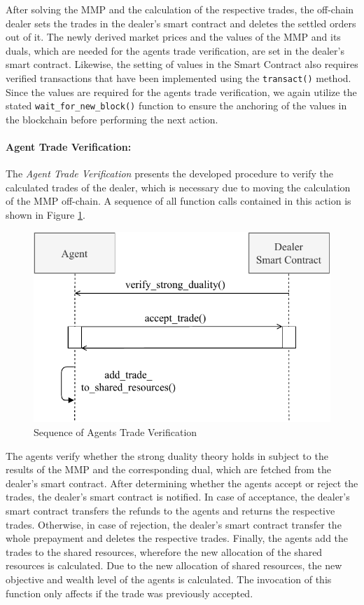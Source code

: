 After solving the MMP and the calculation of the respective 
trades, the off-chain dealer sets the trades in the dealer's smart contract
and deletes the settled orders out of it.
The newly derived market prices and the values of the MMP and its duals, which are needed 
for the agents trade verification, are set in the dealer's smart contract.
Likewise, the setting of values in the Smart Contract also requires verified 
transactions that have been implemented using the \verb|transact()| method. Since the 
values are required for the agents trade verification, we again utilize the stated 
\verb|wait_for_new_block()| function to ensure the anchoring of the values in the blockchain
before performing the next action.

\paragraph{Agent Trade Verification:}
The \textit{Agent Trade Verification} presents the developed procedure to 
verify the calculated trades of the dealer, which is necessary due to moving
the calculation of the MMP off-chain. A sequence of all function calls contained 
in this action is shown in Figure \ref{figure:agents_trade_verification}.

\begin{figure}[htbp]
	\centering
	\includegraphics[width=.8\linewidth]{./figures/trade_verification.pdf}
	\caption{Sequence of Agents Trade Verification}
	\label{figure:agents_trade_verification}
\end{figure}

The agents verify whether the strong duality theory holds in subject 
to the results of the MMP and the corresponding dual, which are 
fetched from the dealer's smart contract. 
After determining whether the agents accept or reject the trades, the dealer's
smart contract is notified.
In case of acceptance, the dealer's smart contract transfers the refunds 
to the agents and returns the respective trades. Otherwise, in case of  
rejection, the dealer's smart contract transfer the whole prepayment 
and deletes the respective trades.
Finally, the agents add the trades to the shared resources, wherefore the new allocation
of the shared resources is calculated. Due to the new allocation of 
shared resources, the new objective and wealth level of the agents is calculated.
The invocation of this function only affects if the trade was previously accepted. \newline

